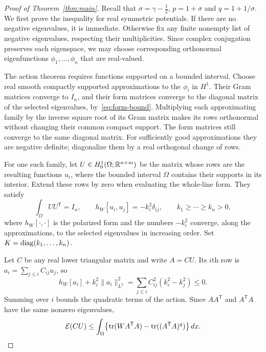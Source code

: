 \begin{proof}[Proof of Theorem~\ref{thm:main}]
Recall that $\sigma=\gamma-\tfrac12$, $p=1+\sigma$ and
$q=1+1/\sigma$.  We first prove the inequality for real symmetric potentials.
If there are no negative eigenvalues, it is immediate.  Otherwise fix any
finite nonempty list of negative eigenvalues, respecting their multiplicities.
Since complex conjugation preserves each eigenspace, we may choose corresponding
orthonormal eigenfunctions $\phi_1,\ldots,\phi_n$ that are real-valued.

The action theorem requires functions supported on a bounded interval.  Choose
real smooth compactly supported approximations to the $\phi_i$ in $H^1$.
Their Gram matrices converge to $I_n$, and their form matrices converge to the
diagonal matrix of the selected eigenvalues, by~\eqref{eq:form-bound}.
Multiplying each approximating family by the inverse square root of its Gram
matrix makes its rows orthonormal without changing their common compact
support.  The form matrices still converge to the same diagonal matrix.
For sufficiently good approximations they are negative definite; diagonalize
them by a real orthogonal change of rows.

For one such family, let $U\in H^1_0(\Omega;\mathbb R^{n\times m})$ be the matrix
whose rows are the resulting functions $u_i$, where the bounded interval
$\Omega$ contains their supports in its interior.  Extend these rows by zero
when evaluating the whole-line form.  They satisfy
\[
 \int_\Omega UU^{\mathsf T}=I_n,
 \qquad h_W[u_i,u_j]=-k_i^2\delta_{ij},
 \qquad k_1\geq\cdots\geq k_n>0,
\]
where $h_W[\cdot,\cdot]$ is the polarized form and the numbers $-k_i^2$
converge, along the approximations, to the selected eigenvalues in increasing
order.  Set $K=\operatorname{diag}(k_1,\ldots,k_n)$.

Let $C$ be any real lower triangular matrix and write $A=CU$.  Its $i$th row
is $a_i=\sum_{j\leq i}C_{ij}u_j$, so
\begin{equation}\label{eq:triangular-spectral-order}
 h_W[a_i]+k_i^2\|a_i\|_{L^2}^2
   =\sum_{j\leq i}C_{ij}^2(k_i^2-k_j^2)\leq0.
\end{equation}
Summing over $i$ bounds the quadratic terms of the action.  Since
$AA^{\mathsf T}$ and $A^{\mathsf T}A$ have the same nonzero eigenvalues,
\begin{equation}\label{eq:spectral-action-upper}
 \mathcal E(CU)
 \leq\int_\Omega
      \bigl\{\operatorname{tr}(WA^{\mathsf T}A)-\operatorname{tr}((A^{\mathsf T}A)^q)\bigr\}\,dx.
\end{equation}


\end{proof}
